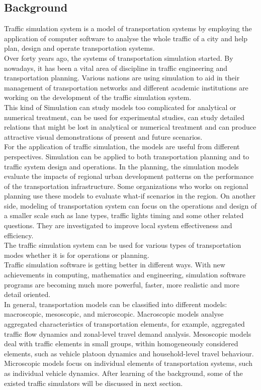 \documentclass[a4paper,12pt]{article}
\begin{document}
\subsection{Background}
Traffic simulation system is a model of transportation systems by employing the application of computer software to analyse the whole traffic of a city and help plan, design and operate transportation systems.\\
Over forty years ago, the systems of transportation simulation started. By nowadays, it has been a vital area of discipline in traffic engineering and transportation planning. Various nations are using simulation to aid in their management of transportation networks and different academic institutions are working on the development of the traffic simulation system.\\
This kind of Simulation can study models too complicated for analytical or numerical treatment, can be used for experimental studies, can study detailed relations that might be lost in analytical or numerical treatment and can produce attractive visual demonstrations of present and future scenarios.\\
For the application of traffic simulation, the models are useful from different perspectives. Simulation can be applied to both transportation planning and to traffic system design and operations. In the planning, the simulation models evaluate the impacts of regional urban development patterns on the performance of the transportation infrastructure. Some organizations who works on regional planning use these models to evaluate what-if scenarios in the region. On another side, modeling of transportation system can focus on the operations and design of a smaller scale such as lane types, traffic lights timing and some other related questions. They are investigated to improve local system effectiveness and efficiency.\\
The traffic simulation system can be used for various types of transportation modes whether it is for operations or planning.\\
Traffic simulation software is getting better in different ways. With new achievements in computing, mathematics and engineering, simulation software programs are becoming much more powerful, faster, more realistic and more detail oriented.\\
In general, transportation models can be classified into different models: macroscopic, mesoscopic, and microscopic. Macroscopic models analyse aggregated characteristics of transportation elements, for example, aggregated traffic flow dynamics and zonal-level travel demand analysis. Mesoscopic models deal with traffic elements in small groups, within homogeneously considered elements, such as vehicle platoon dynamics and household-level travel behaviour. Microscopic models focus on individual elements of transportation systems, such as individual vehicle dynamics.
After learning of the background, some of the existed traffic simulators will be discussed in next section.\\
\end{document}
